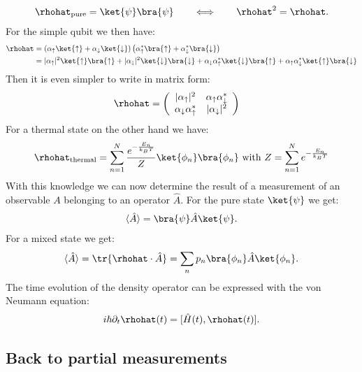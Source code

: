 \begin{align}
	\rhohat_{\text{pure}} = \ket{\psi}\bra{\psi} \qquad \Longleftrightarrow \qquad \rhohat^2 = \rhohat.
\end{align}
For the simple qubit we then have:
\begin{align}
  \rhohat &= \left(\alpha_\uparrow\ket{\uparrow}+\alpha_\downarrow\ket{\downarrow}\right)\left(\alpha_\uparrow^*\bra{\uparrow}+\alpha_\downarrow^*\bra{\downarrow}\right)\\
  &= |\alpha_\uparrow|^2\ket{\uparrow}\bra{\uparrow}+|\alpha_\downarrow|^2\ket{\downarrow}\bra{\downarrow}+\alpha_\downarrow\alpha_\uparrow^*\ket{\downarrow}\bra{\uparrow}+\alpha_\uparrow\alpha_\downarrow^*\ket{\uparrow}\bra{\downarrow}
\end{align}
Then it is even simpler to write in matrix form:
\begin{align}
  \rhohat &= \left(\begin{array}{cc}
  |\alpha_\uparrow|^2&\alpha_\uparrow\alpha_\downarrow^*\\
  \alpha_\downarrow\alpha_\uparrow^*&|\alpha_\downarrow|^2
  \end{array}\right)
\end{align}
For a thermal state on the other hand we have:
\begin{align}
	\rhohat_{\text{thermal}} = \sum_{n=1}^N \frac{e^{-\frac{E_n}{k_BT}}}{Z} \ket{\phi_n}\bra{\phi_n}\text{ with }Z = \sum_{n=1}^N e^{-\frac{E_n}{k_BT}}
\end{align}
With this knowledge we can now determine the result of a measurement of an observable $A$ belonging to an operator $\hat{A}$. For the pure state $\ket{\psi}$ we get:
%
\begin{align}
				\langle \hat{A}\rangle = \bra{\psi} \hat{A} \ket{\psi}.
\end{align}
For a mixed state we get:
\begin{align}
	\langle \hat{A}\rangle = \tr{\rhohat \cdot \hat{A}} = \sum_n {p_n} \bra{\phi_n} \hat{A} \ket{\phi_n}.
\end{align}
The time evolution of the density operator can be expressed with the von Neumann equation:
\begin{align}
	i\hbar \partial_{t}\rhohat(t) = [\hat{H}(t),\rhohat(t)].
\end{align}

\subsection{Back to partial measurements}

